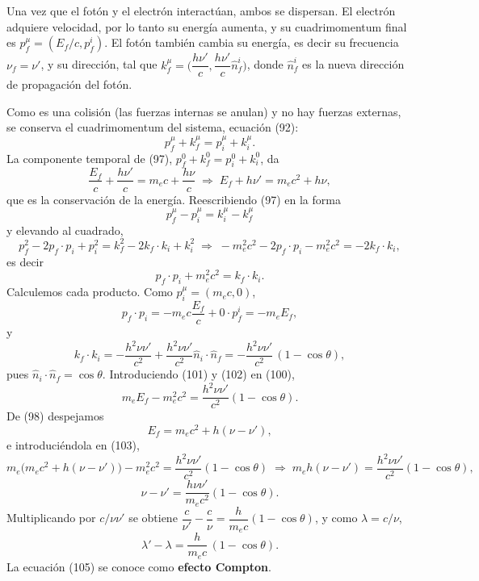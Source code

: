 \begin{center}
\end{center}

Una vez que el fotón y el electrón interactúan, ambos se dispersan. El
electrón adquiere velocidad, por lo tanto su energía aumenta, y su
cuadrimomentum final es $p^\mu_f=(E_f/c,p^i_f)$. El fotón también cambia
su energía, es decir su frecuencia $\nu_f=\nu'$, y su dirección, tal que
$k^\mu_f=\Big(\dfrac{h\nu'}{c},\dfrac{h\nu'}{c}\hat n^i_f\Big)$, donde
$\hat n^i_f$ es la nueva dirección de propagación del fotón.

Como es una colisión (las fuerzas internas se anulan) y no hay fuerzas
externas, se conserva el cuadrimomentum del sistema, ecuación (92):
\[
p^\mu_f+k^\mu_f = p^\mu_i+k^\mu_i . \tag{97}
\]
La componente temporal de (97), $p^0_f+k^0_f=p^0_i+k^0_i$, da
\[
\frac{E_f}{c}+\frac{h\nu'}{c} = m_ec+\frac{h\nu}{c} \;\Rightarrow\;
E_f+h\nu' = m_ec^2+h\nu , \tag{98}
\]
que es la conservación de la energía. Reescribiendo (97) en la forma
\[
p^\mu_f-p^\mu_i = k^\mu_i-k^\mu_f \tag{99}
\]
y elevando al cuadrado,
\[
p_f^2-2p_f\cdot p_i+p_i^2 = k_f^2-2k_f\cdot k_i+k_i^2 \;\Rightarrow\;
-m_e^2c^2-2p_f\cdot p_i-m_e^2c^2 = -2k_f\cdot k_i,
\]
es decir
\[
p_f\cdot p_i+m_e^2c^2 = k_f\cdot k_i . \tag{100}
\]
Calculemos cada producto. Como $p_i^\mu=(m_ec,0)$,
\[
p_f\cdot p_i = -m_ec\frac{E_f}{c}+0\cdot p^i_f = -m_eE_f, \tag{101}
\]
y
\[
k_f\cdot k_i = -\frac{h^2\nu\nu'}{c^2}+\frac{h^2\nu\nu'}{c^2}\hat n_i\cdot
\hat n_f = -\frac{h^2\nu\nu'}{c^2}\,(1-\cos\theta), \tag{102}
\]
pues $\hat n_i\cdot\hat n_f=\cos\theta$. Introduciendo (101) y (102) en
(100),
\[
m_eE_f-m_e^2c^2 = \frac{h^2\nu\nu'}{c^2}(1-\cos\theta). \tag{103}
\]
De (98) despejamos
\[
E_f = m_ec^2+h(\nu-\nu'), \tag{104}
\]
e introduciéndola en (103),
\[
m_e\big(m_ec^2+h(\nu-\nu')\big)-m_e^2c^2 = \frac{h^2\nu\nu'}{c^2}
(1-\cos\theta) \;\Rightarrow\; m_eh(\nu-\nu') = \frac{h^2\nu\nu'}{c^2}
(1-\cos\theta),
\]
\[
\nu-\nu' = \frac{h\nu\nu'}{m_ec^2}(1-\cos\theta).
\]
Multiplicando por $c/\nu\nu'$ se obtiene $\dfrac c{\nu'}-\dfrac c\nu=
\dfrac h{m_ec}(1-\cos\theta)$, y como $\lambda=c/\nu$,
\[
\lambda'-\lambda = \frac{h}{m_ec}\,(1-\cos\theta). \tag{105}
\]
La ecuación (105) se conoce como \textbf{efecto Compton}.

